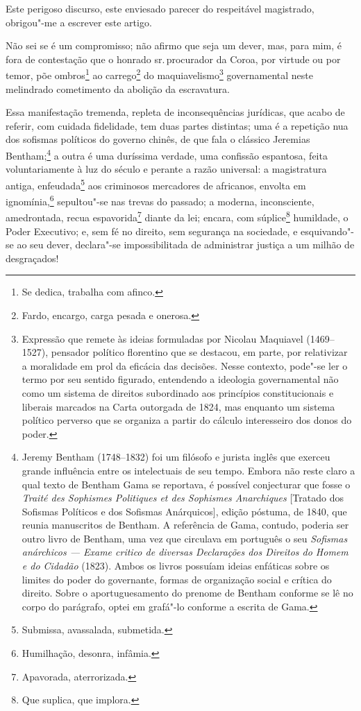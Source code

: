 Este perigoso discurso, este enviesado parecer do respeitável
magistrado, obrigou"-me a escrever este artigo.

\asterisc

Não sei se é um compromisso; não afirmo que seja um dever, mas, para
mim, é fora de contestação que o honrado sr.\,procurador da Coroa, por
virtude ou por temor, põe ombros\footnote{Se dedica, trabalha com
  afinco.} ao carrego\footnote{Fardo, encargo, carga pesada e onerosa.}
do maquiavelismo\footnote{Expressão que remete às ideias formuladas
  por Nicolau Maquiavel (1469--1527), pensador político florentino que se
  destacou, em parte, por relativizar a moralidade em prol da
  eficácia das decisões. Nesse contexto, pode"-se ler o termo por seu
  sentido figurado, entendendo a ideologia governamental não como um
  sistema de direitos subordinado aos princípios constitucionais e
  liberais marcados na Carta outorgada de 1824, mas enquanto um sistema
  político perverso que se organiza a partir do cálculo interesseiro dos
  donos do poder.} governamental neste melindrado cometimento da
abolição da escravatura.

Essa manifestação tremenda, repleta de inconsequências jurídicas, que
acabo de referir, com cuidada fidelidade, tem duas partes distintas; uma
é a repetição nua dos sofismas políticos do governo chinês, de que fala
o clássico Jeremias Bentham;\footnote{Jeremy Bentham (1748--1832) foi um
  filósofo e jurista inglês que exerceu grande influência entre os
  intelectuais de seu tempo. Embora não reste claro a
  qual texto de Bentham Gama se reportava, é possível conjecturar que
  fosse o \emph{Traité des Sophismes Politiques et des Sophismes
  Anarchiques} {[}Tratado dos Sofismas Políticos e dos Sofismas
  Anárquicos{]}, edição póstuma, de 1840, que reunia manuscritos de
  Bentham. A referência de Gama, contudo, poderia ser outro livro de
  Bentham, uma vez que circulava em português o seu \emph{Sofismas
  anárchicos --- Exame critico de diversas Declarações dos Direitos do
  Homem e do Cidadão} (1823). Ambos os livros possuíam ideias enfáticas
  sobre os limites do poder do governante, formas de organização social
  e crítica do direito. Sobre o aportuguesamento do prenome de Bentham
  conforme se lê no corpo do parágrafo, optei em grafá"-lo conforme a
  escrita de Gama.} a outra é uma duríssima verdade, uma confissão
espantosa, feita voluntariamente à luz do século e perante a razão
universal: a magistratura antiga, enfeudada\footnote{Submissa,
  avassalada, submetida.} aos criminosos mercadores de africanos,
envolta em ignomínia,\footnote{Humilhação, desonra, infâmia.}
sepultou"-se nas trevas do passado; a moderna, inconsciente, amedrontada,
recua espavorida\footnote{Apavorada, aterrorizada.} diante da lei;
encara, com súplice\footnote{Que suplica, que implora.} humildade, o
Poder Executivo; e, sem fé no direito, sem segurança na sociedade, e
esquivando"-se ao seu dever, declara"-se impossibilitada de administrar
justiça a um milhão de desgraçados!

